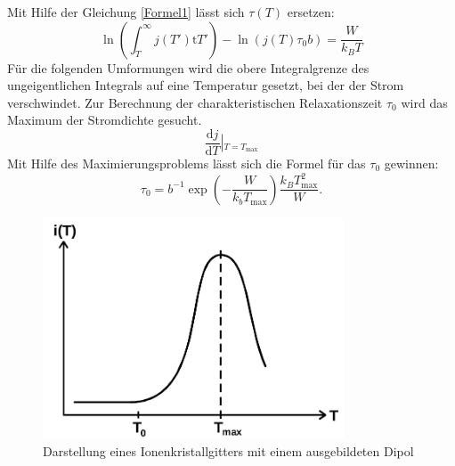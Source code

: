 Mit Hilfe der Gleichung \eqref{Formel1} lässt sich $\tau(T)$ ersetzen:
\begin{equation}
    \label{Formel7}
\ln(\int_T^\infty j(T')\text{t}T')-\ln(j(T)\tau_0 b)=\frac{W}{k_BT}
\end{equation}
Für die folgenden Umformungen wird die obere Integralgrenze
des ungeigentlichen Integrals auf eine Temperatur gesetzt, bei der der Strom
verschwindet. Zur Berechnung der charakteristischen Relaxationszeit
$\tau_0$ wird das Maximum der Stromdichte gesucht.
$$ \frac{\text{d}j}{\text{d}T}\left|_{T=T_\text{max}} \right.$$
Mit Hilfe des Maximierungsproblems lässt sich die Formel für das $\tau_0$
gewinnen:
\begin{equation}
    \label{Formel8}
    \tau_0=b^{-1}\exp \left(-\frac{W}{k_b T_{\text{max}}}\right)
            \frac{k_BT^2_\text{max}}{W}.
\end{equation}

\begin{figure}
\centering
\includegraphics[width=0.8\textwidth]{ressources/stromfluss.png}
\caption{Darstellung eines Ionenkristallgitters mit einem ausgebildeten Dipol}
\label{theo1}
\end{figure}



